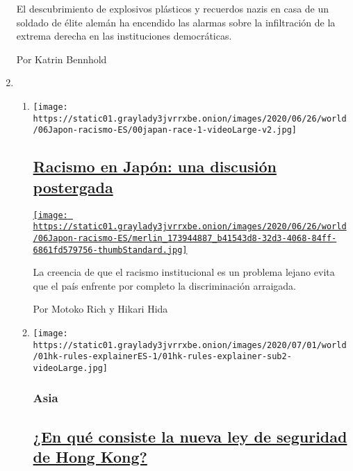 \begin{enumerate}
  El descubrimiento de explosivos plásticos y recuerdos nazis en casa de
  un soldado de élite alemán ha encendido las alarmas sobre la
  infiltración de la extrema derecha en las instituciones democráticas.

  Por Katrin Bennhold
\item
  \begin{enumerate}
  \def\labelenumii{\arabic{enumii}.}
  \item
    \texttt{[image: https://static01.graylady3jvrrxbe.onion/images/2020/06/26/world/06Japon-racismo-ES/00japan-race-1-videoLarge-v2.jpg]}

    \hypertarget{racismo-en-japuxf3n-una-discusiuxf3n-postergada}{%
    \subsection{\texorpdfstring{\href{/es/2020/07/06/espanol/mundo/racismo-japon-protestas.html}{Racismo
    en Japón: una discusión
    postergada}}{Racismo en Japón: una discusión postergada}}\label{racismo-en-japuxf3n-una-discusiuxf3n-postergada}}

    \href{/es/2020/07/06/espanol/mundo/racismo-japon-protestas.html}{\texttt{[image: https://static01.graylady3jvrrxbe.onion/images/2020/06/26/world/06Japon-racismo-ES/merlin\_173944887\_b41543d8-32d3-4068-84ff-6861fd579756-thumbStandard.jpg]}}

    La creencia de que el racismo institucional es un problema lejano
    evita que el país enfrente por completo la discriminación arraigada.

    Por Motoko Rich y Hikari Hida
  \item
    \texttt{[image: https://static01.graylady3jvrrxbe.onion/images/2020/07/01/world/01hk-rules-explainerES-1/01hk-rules-explainer-sub2-videoLarge.jpg]}

    \hypertarget{asia}{%
    \subsubsection{Asia}\label{asia}}

    \hypertarget{en-quuxe9-consiste-la-nueva-ley-de-seguridad-de-hong-kong}{%
    \subsection{\texorpdfstring{\href{/es/2020/07/01/espanol/mundo/china-ley-seguridad-Hong-Kong.html}{¿En
    qué consiste la nueva ley de seguridad de Hong
    Kong?}}{¿En qué consiste la nueva ley de seguridad de Hong Kong?}}\label{en-quuxe9-consiste-la-nueva-ley-de-seguridad-de-hong-kong}}


\end{enumerate}
\end{enumerate}
